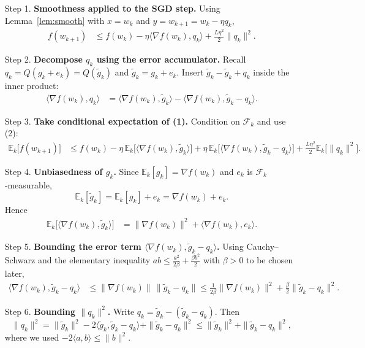 \documentclass{article}
\newcommand{\E}{\mathbb{E}}
\begin{document}
\begin{enumerate}
\item[Step 1.] \textbf{Smoothness applied to the SGD step.}
Using Lemma~\ref{lem:smooth} with $x=w_k$ and $y=w_{k+1}=w_k-\eta q_k$,
\begin{align}
f(w_{k+1})
&\le f(w_k)-\eta\langle\nabla f(w_k),q_k\rangle
+\frac{L\eta^{2}}{2}\|q_k\|^{2}.
\tag{1}
\end{align}
\item[Step 2.] \textbf{Decompose $q_k$ using the error accumulator.}
Recall $q_k=Q(g_k+e_k)=Q(\tilde g_k)$ and $\tilde g_k=g_k+e_k$.
Insert $\tilde g_k-\tilde g_k+q_k$ inside the inner product:
\begin{align}
\langle\nabla f(w_k),q_k\rangle
&=\langle\nabla f(w_k),\tilde g_k\rangle
-\langle\nabla f(w_k),\tilde g_k-q_k\rangle.
\tag{2}
\end{align}
\item[Step 3.] \textbf{Take conditional expectation of (1).}
Condition on $\mathcal F_k$ and use (2):
\begin{align}
\E_k\!\bigl[f(w_{k+1})\bigr]
&\le f(w_k)-\eta\,\E_k\!\bigl[\langle\nabla f(w_k),\tilde g_k\rangle\bigr]
+\eta\,\E_k\!\bigl[\langle\nabla f(w_k),\tilde g_k-q_k\rangle\bigr]
+\frac{L\eta^{2}}{2}\E_k\!\bigl[\|q_k\|^{2}\bigr].
\tag{3}
\end{align}
\item[Step 4.] \textbf{Unbiasedness of $g_k$.}
Since $\E_k[g_k]=\nabla f(w_k)$ and $e_k$ is $\mathcal F_k$‑measurable,
\[
\E_k[\tilde g_k]=\E_k[g_k]+e_k=\nabla f(w_k)+e_k.
\]
Hence
\begin{align}
\E_k\!\bigl[\langle\nabla f(w_k),\tilde g_k\rangle\bigr]
&= \|\nabla f(w_k)\|^{2}
+\langle\nabla f(w_k),e_k\rangle.
\tag{4}
\end{align}
\item[Step 5.] \textbf{Bounding the error term $\langle\nabla f(w_k),\tilde g_k-q_k\rangle$.}
Using Cauchy–Schwarz and the elementary inequality $ab\le\frac{a^{2}}{2\beta}
+\frac{\beta b^{2}}{2}$ with $\beta>0$ to be chosen later,
\begin{align}
\langle\nabla f(w_k),\tilde g_k-q_k\rangle
&\le \|\nabla f(w_k)\|\,\|\tilde g_k-q_k\|
\le \frac{1}{2\beta}\|\nabla f(w_k)\|^{2}
+\frac{\beta}{2}\|\tilde g_k-q_k\|^{2}.
\tag{5}
\end{align}
\item[Step 6.] \textbf{Bounding $\|q_k\|^{2}$.}
Write $q_k=\tilde g_k-(\tilde g_k-q_k)$. Then
\[
\|q_k\|^{2}
=\|\tilde g_k\|^{2}
-2\langle\tilde g_k,\tilde g_k-q_k\rangle
+\|\tilde g_k-q_k\|^{2}
\le \|\tilde g_k\|^{2}+\|\tilde g_k-q_k\|^{2},
\tag{6}
\]
where we used $-2\langle a,b\rangle\le \|b\|^{2}$.


\end{enumerate}
\end{document}
